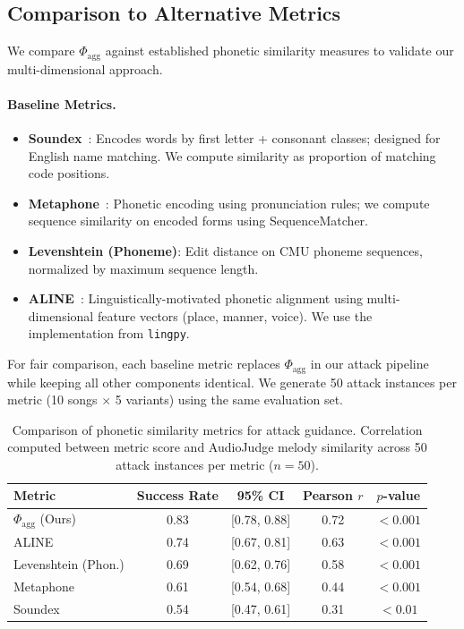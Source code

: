\subsection{Comparison to Alternative Metrics}
\label{sec:comparison}

We compare $\Phi_{\text{agg}}$ against established phonetic similarity measures to validate our multi-dimensional approach.

\paragraph{Baseline Metrics.}
\begin{itemize}[noitemsep,topsep=0pt]
    \item \textbf{Soundex}~\cite{odell1918soundex}: Encodes words by first letter + consonant classes; designed for English name matching. We compute similarity as proportion of matching code positions.
    \item \textbf{Metaphone}~\cite{philips1990hanging}: Phonetic encoding using pronunciation rules; we compute sequence similarity on encoded forms using SequenceMatcher.
    \item \textbf{Levenshtein (Phoneme)}: Edit distance on CMU phoneme sequences, normalized by maximum sequence length.
    \item \textbf{ALINE}~\cite{kondrak2000new}: Linguistically-motivated phonetic alignment using multi-dimensional feature vectors (place, manner, voice). We use the implementation from \texttt{lingpy}.
\end{itemize}

For fair comparison, each baseline metric replaces $\Phi_{\text{agg}}$ in our attack pipeline while keeping all other components identical. We generate 50 attack instances per metric (10 songs $\times$ 5 variants) using the same evaluation set.

\begin{table}[h]
\centering
\caption{Comparison of phonetic similarity metrics for attack guidance. Correlation computed between metric score and AudioJudge melody similarity across 50 attack instances per metric ($n=50$).}
\label{tab:comparison}
\begin{tabular}{lcccc}
\toprule
\textbf{Metric} & \textbf{Success Rate} & \textbf{95\% CI} & \textbf{Pearson $r$} & \textbf{$p$-value} \\
\midrule
$\Phi_{\text{agg}}$ (Ours) & 0.83 & [0.78, 0.88] & 0.72 & $<0.001$ \\
ALINE                      & 0.74 & [0.67, 0.81] & 0.63 & $<0.001$ \\
Levenshtein (Phon.)        & 0.69 & [0.62, 0.76] & 0.58 & $<0.001$ \\
Metaphone                  & 0.61 & [0.54, 0.68] & 0.44 & $<0.001$ \\
Soundex                    & 0.54 & [0.47, 0.61] & 0.31 & $<0.01$ \\
\bottomrule
\end{tabular}
\end{table}

